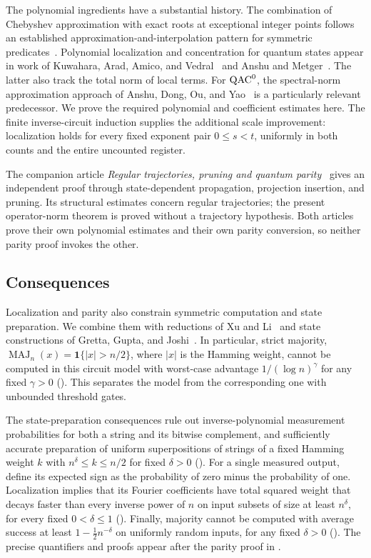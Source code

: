 The polynomial ingredients have a substantial history. The combination
of Chebyshev approximation with exact roots at exceptional integer
points follows an established approximation-and-interpolation pattern
for symmetric predicates~\cite[Section 3.1]{Sherstov2009}.
Polynomial localization and concentration for quantum states appear in
work of Kuwahara, Arad, Amico, and
Vedral~\cite{KuwaharaAradAmicoVedral2017} and Anshu and
Metger~\cite{AnshuMetger2023}. The latter also track the total norm of
local terms. For $\mathrm{QAC}^0$, the spectral-norm approximation approach of
Anshu, Dong, Ou, and Yao~\cite{ADOY2025} is a particularly relevant
predecessor. We prove the required polynomial and coefficient estimates
here. The finite inverse-circuit induction supplies the additional scale
improvement: localization holds for every fixed exponent pair
$0\le s<t$, uniformly in both counts and the entire uncounted register.

The companion article \emph{Regular trajectories, pruning and quantum
parity}~\cite[Sections 4--7]{OpenAI2026Trajectories} gives an independent proof through
state-dependent propagation, projection insertion, and pruning.
Its structural estimates concern regular trajectories; the present
operator-norm theorem is proved without a trajectory hypothesis.
Both articles prove their own polynomial estimates and their own parity
conversion, so neither parity proof invokes the other.

\subsection{Consequences}

Localization and parity also constrain symmetric computation and state
preparation. We combine them with reductions of Xu and Li~\cite{XuLi2026Fanout}
and state constructions of Gretta, Gupta, and Joshi~\cite{GGJ2026}.
In particular, strict majority,
$\operatorname{MAJ}_n(x)=\mathbf 1\{|x|>n/2\}$, where $|x|$ is the
Hamming weight, cannot be computed in this circuit model with worst-case advantage $1/(\log n)^\gamma$
for any fixed $\gamma>0$ (). This separates
the model from the corresponding one with unbounded threshold gates.

The state-preparation consequences rule out inverse-polynomial
measurement probabilities for both a string and its bitwise complement,
and sufficiently accurate preparation of uniform superpositions of
strings of a fixed Hamming weight $k$ with $n^\delta\le k\le n/2$
for fixed $\delta>0$ (). For a single measured output, define
its expected sign as the probability of zero minus the probability of one.
Localization implies that its Fourier coefficients have total squared
weight that decays faster than every inverse power of $n$ on input
subsets of size at least $n^\delta$, for every fixed
$0<\delta\le1$ (). Finally, majority cannot be computed
with average success at least $1-\tfrac12 n^{-\delta}$ on uniformly
random inputs, for any fixed $\delta>0$ ().
The precise quantifiers and proofs
appear after the parity proof in .


